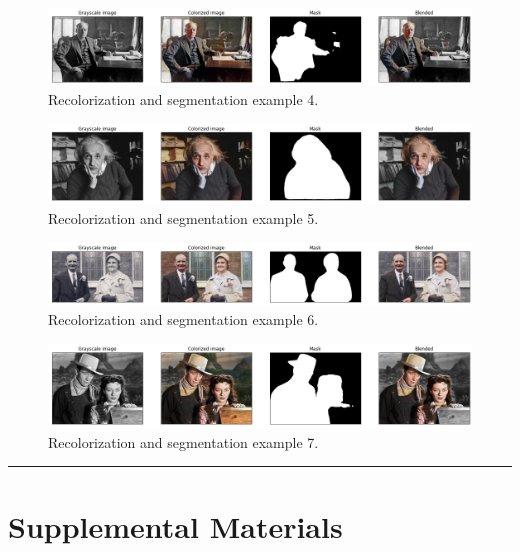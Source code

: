 \documentclass[
]{article}
\begin{document}
\begin{figure}
\centering
\includegraphics{report_images/segment-blend-result-4.png}
\caption{Recolorization and segmentation example 4.}
\label{fig:segmentation-and-blending-4}
\end{figure}

\begin{figure}
\centering
\includegraphics{report_images/segment-blend-result-3.png}
\caption{Recolorization and segmentation example 5.}
\label{fig:segmentation-and-blending-5}
\end{figure}

\begin{figure}
\centering
\includegraphics{report_images/segment-blend-result-2.png}
\caption{Recolorization and segmentation example 6.}
\label{fig:segmentation-and-blending-6}
\end{figure}

\begin{figure}
\centering
\includegraphics{report_images/segment-blend-result-1.png}
\caption{Recolorization and segmentation example 7.}
\label{fig:segmentation-and-blending-7}
\end{figure}

\begin{center}\rule{0.5\linewidth}{0.5pt}\end{center}
\clearpage
\hypertarget{supplemental-materials}{%
\section{Supplemental Materials}\label{supplemental-materials}}
\end{document}
